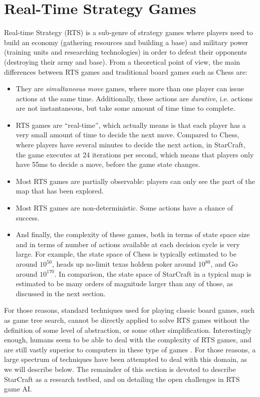 \documentclass[journal]{IEEEtran}
\begin{document}

\section{Real-Time Strategy Games}\label{sec:rts}

Real-time Strategy (RTS) is a sub-genre of strategy games where players need to build an economy (gathering resources and building a base) and military power (training units and researching technologies) in order to defeat their opponents (destroying their army and base). From a theoretical point of view, the main differences between RTS games and traditional board games such as Chess are:

\begin{itemize}
\item They are {\em simultaneous move} games, where more than one player can issue actions at the same time. Additionally, these actions are {\em durative}, i.e. actions are not instantaneous, but take some amount of time time to complete.
\item RTS games are ``real-time'', which actually means is that each player has a very small amount of time to decide the next move. Compared to Chess, where players have several minutes to decide the next action, in StarCraft, the game executes at 24 iterations per second, which means that players only have 55ms to decide a move, before the game state changes.
\item Most RTS games are partially observable: players can only see the part of the map that has been explored.
\item Most RTS games are non-deterministic. Some actions have a chance of success.
\item And finally, the complexity of these games, both in terms of state space size and in terms of number of actions available at each decision cycle is very large. For example, the state space of Chess is typically estimated to be around $10^{50}$, heads up no-limit texas holdem poker around $10^{80}$, and Go around $10^{170}$. In comparison, the state space of StarCraft in a typical map is estimated to be many orders of magnitude larger than any of those, as discussed in the next section.
\end{itemize}

For those reasons, standard techniques used for playing classic board games, such as game tree search, cannot be directly applied to solve RTS games without the definition of some level of abstraction, or some other simplification. Interestingly enough, humans seem to be able to deal with the complexity of RTS games, and are still vastly superior to computers in these type of games \cite{burochurchill2012aimagazine}. For those reasons, a large spectrum of techniques have been attempted to deal with this domain, as we will describe below. The remainder of this section is devoted to describe StarCraft as a research testbed, and on detailing the open challenges in RTS game AI.
\end{document}

